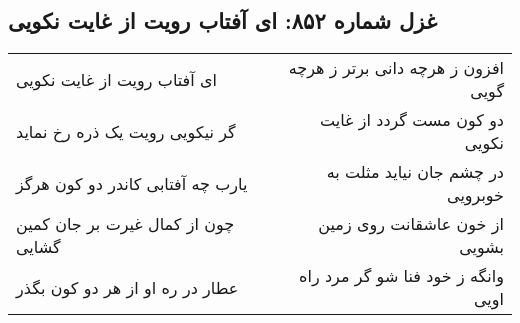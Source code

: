 \begin{center}
\section*{غزل شماره ۸۵۲: ای آفتاب رویت از غایت نکویی}
\label{sec:852}
\begin{longtable}{l p{0.5cm} r}
ای آفتاب رویت از غایت نکویی
&&
افزون ز هرچه دانی برتر ز هرچه گویی
\\
گر نیکویی رویت یک ذره رخ نماید
&&
دو کون مست گردد از غایت نکویی
\\
یارب چه آفتابی کاندر دو کون هرگز
&&
در چشم جان نیاید مثلت به خوبرویی
\\
چون از کمال غیرت بر جان کمین گشایی
&&
از خون عاشقانت روی زمین بشویی
\\
عطار در ره او از هر دو کون بگذر
&&
وانگه ز خود فنا شو گر مرد راه اویی
\\
\end{longtable}
\end{center}
